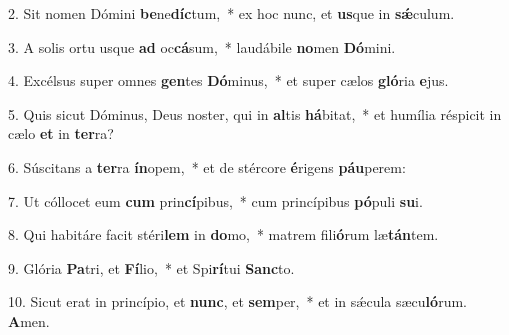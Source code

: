 2. Sit nomen Dómini \textbf{be}ne\textbf{díc}tum,~*  ex hoc nunc, et \textbf{us}que in \textbf{sǽ}culum.\

3. A solis ortu usque \textbf{ad} oc\textbf{cá}sum,~*  laudábile \textbf{no}men \textbf{Dó}mini.\

4. Excélsus super omnes \textbf{gen}tes \textbf{Dó}minus,~*  et super cælos \textbf{gló}ria \textbf{e}jus.\

5. Quis sicut Dóminus, Deus noster, qui in \textbf{al}tis \textbf{há}bitat,~*  et humília réspicit in cælo \textbf{et} in \textbf{ter}ra?\

6. Súscitans a \textbf{ter}ra \textbf{ín}opem,~*  et de stércore \textbf{é}rigens \textbf{páu}perem:\

7. Ut cóllocet eum \textbf{cum} prin\textbf{cí}pibus,~*  cum princípibus \textbf{pó}puli \textbf{su}i.\

8. Qui habitáre facit stéri\textbf{lem} in \textbf{do}mo,~*  matrem fili\textbf{ó}rum læ\textbf{tán}tem.\

9. Glória \textbf{Pa}tri, et \textbf{Fí}lio,~*  et Spi\textbf{rí}tui \textbf{Sanc}to.\

10. Sicut erat in princípio, et \textbf{nunc}, et \textbf{sem}per,~*  et in sǽcula sæcu\textbf{ló}rum. \textbf{A}men.\

